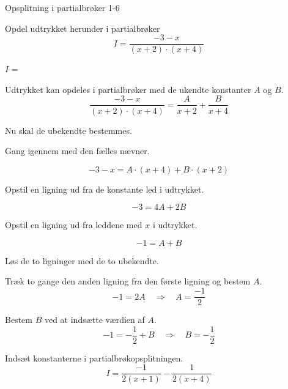 \documentclass{article}
\begin{document}
\begin{exercise}{Opsplitning i partialbrøker 1-6}

Opdel udtrykket herunder i partialbrøker
\[
I = \frac{-3 - x}{(x + 2) \cdot (x + 4)}
\]

$I$ = 

\hint
Udtrykket kan opdeles i partialbrøker med de ukendte konstanter $A$ og $B$.
\[
\frac{-3 - x}{(x + 2) \cdot (x + 4)} =
\frac{A}{x + 2} + \frac{B}{x + 4}
\]

\hint
Nu skal de ubekendte bestemmes.

\hint
Gang igennem med den fælles nævner.

\hint
\[
-3 - x = A \cdot (x + 4) + B \cdot (x + 2)
\]

\hint
Opstil en ligning ud fra de konstante led i udtrykket.

\hint
\[
-3 = 4A+ 2B
\]

\hint
Opstil en ligning ud fra leddene med $x$ i udtrykket.

\hint
\[
-1 = A + B
\]

\hint
Løs de to ligninger med de to ubekendte.

\hint
Træk to gange den anden ligning fra den første ligning og bestem $A$.
\[
-1 = 2A \quad \Rightarrow \quad A = \frac{-1}{2}
\]

\hint
Bestem $B$ ved at indsætte værdien af $A$.
\[
-1 = - \frac{1}{2} + B \quad \Rightarrow \quad B = - \frac{1}{2}
\]

\hint
Indsæt konstanterne i partialbrøkopsplitningen.
\[
I = \frac{-1}{2(x + 1)} - \frac{1}{2(x + 4)}
\]



\end{exercise}
\end{document}
